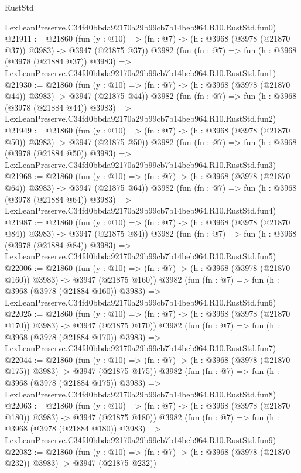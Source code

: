 \begin{lexlean}{RustStd}
\begin{coremodule}
    LexLeanPreserve.C34fd0bbda92170a29b99cb7b14beb964.R10.RustStd.fun0)
@21911 := @21860
    (fun (y : @10) => (fn : @7) -> (h : @3968 (@3978 (@21870 @37)) @3983) -> @3947 (@21875 @37))
    @3982
    (fun (fn : @7) =>
    fun (h : @3968 (@3978 (@21884 @37)) @3983) =>
    LexLeanPreserve.C34fd0bbda92170a29b99cb7b14beb964.R10.RustStd.fun1)
@21930 := @21860
    (fun (y : @10) => (fn : @7) -> (h : @3968 (@3978 (@21870 @44)) @3983) -> @3947 (@21875 @44))
    @3982
    (fun (fn : @7) =>
    fun (h : @3968 (@3978 (@21884 @44)) @3983) =>
    LexLeanPreserve.C34fd0bbda92170a29b99cb7b14beb964.R10.RustStd.fun2)
@21949 := @21860
    (fun (y : @10) => (fn : @7) -> (h : @3968 (@3978 (@21870 @50)) @3983) -> @3947 (@21875 @50))
    @3982
    (fun (fn : @7) =>
    fun (h : @3968 (@3978 (@21884 @50)) @3983) =>
    LexLeanPreserve.C34fd0bbda92170a29b99cb7b14beb964.R10.RustStd.fun3)
@21968 := @21860
    (fun (y : @10) => (fn : @7) -> (h : @3968 (@3978 (@21870 @64)) @3983) -> @3947 (@21875 @64))
    @3982
    (fun (fn : @7) =>
    fun (h : @3968 (@3978 (@21884 @64)) @3983) =>
    LexLeanPreserve.C34fd0bbda92170a29b99cb7b14beb964.R10.RustStd.fun4)
@21987 := @21860
    (fun (y : @10) => (fn : @7) -> (h : @3968 (@3978 (@21870 @84)) @3983) -> @3947 (@21875 @84))
    @3982
    (fun (fn : @7) =>
    fun (h : @3968 (@3978 (@21884 @84)) @3983) =>
    LexLeanPreserve.C34fd0bbda92170a29b99cb7b14beb964.R10.RustStd.fun5)
@22006 := @21860
    (fun (y : @10) => (fn : @7) -> (h : @3968 (@3978 (@21870 @160)) @3983) -> @3947 (@21875 @160))
    @3982
    (fun (fn : @7) =>
    fun (h : @3968 (@3978 (@21884 @160)) @3983) =>
    LexLeanPreserve.C34fd0bbda92170a29b99cb7b14beb964.R10.RustStd.fun6)
@22025 := @21860
    (fun (y : @10) => (fn : @7) -> (h : @3968 (@3978 (@21870 @170)) @3983) -> @3947 (@21875 @170))
    @3982
    (fun (fn : @7) =>
    fun (h : @3968 (@3978 (@21884 @170)) @3983) =>
    LexLeanPreserve.C34fd0bbda92170a29b99cb7b14beb964.R10.RustStd.fun7)
@22044 := @21860
    (fun (y : @10) => (fn : @7) -> (h : @3968 (@3978 (@21870 @175)) @3983) -> @3947 (@21875 @175))
    @3982
    (fun (fn : @7) =>
    fun (h : @3968 (@3978 (@21884 @175)) @3983) =>
    LexLeanPreserve.C34fd0bbda92170a29b99cb7b14beb964.R10.RustStd.fun8)
@22063 := @21860
    (fun (y : @10) => (fn : @7) -> (h : @3968 (@3978 (@21870 @180)) @3983) -> @3947 (@21875 @180))
    @3982
    (fun (fn : @7) =>
    fun (h : @3968 (@3978 (@21884 @180)) @3983) =>
    LexLeanPreserve.C34fd0bbda92170a29b99cb7b14beb964.R10.RustStd.fun9)
@22082 := @21860
    (fun (y : @10) => (fn : @7) -> (h : @3968 (@3978 (@21870 @232)) @3983) -> @3947 (@21875 @232))

\end{coremodule}
\end{lexlean}
